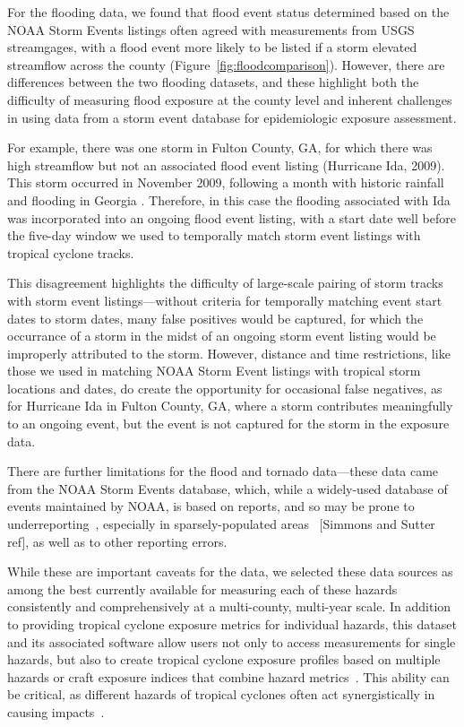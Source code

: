 For the flooding data, we found that flood event status determined based
on the NOAA Storm Events listings often agreed with measurements from \ac{USGS}
streamgages, with a flood event more likely to be listed if a storm elevated
streamflow across the county (Figure~\ref{fig:floodcomparison}).  However, there
are differences between the two flooding datasets, and these highlight both the
difficulty of measuring flood exposure at the county level and inherent
challenges in using data from a storm event database for epidemiologic exposure
assessment. 

For example, there was one storm in Fulton County, GA, for which there was high
streamflow but not an associated flood event listing (Hurricane Ida, 2009).
This storm occurred in November 2009, following a month with historic rainfall
and flooding in Georgia \parencite{shepherd2011overview}.  Therefore, in this
case the flooding associated with Ida was incorporated into an ongoing flood
event listing, with a start date well before the five-day window we used to
temporally match storm event listings with tropical cyclone tracks. 

This disagreement highlights the difficulty of large-scale pairing of storm
tracks with storm event listings---without criteria for temporally matching
event start dates to storm dates, many false positives would be
captured, for which the occurrance of a storm in the midst of an ongoing storm
event listing would be improperly attributed to the storm.  However, distance
and time restrictions, like those we used in matching NOAA Storm Event listings
with tropical storm locations and dates, do create the opportunity for
occasional false negatives, as for Hurricane Ida in Fulton County, GA, where a
storm contributes meaningfully to an ongoing event, but the event is not
captured for the storm in the exposure data.  

There are further limitations for the flood and tornado data---these data came
from the \ac{NOAA} Storm Events database, which, while a widely-used database
of events maintained by \ac{NOAA}, is based on reports, and so may be prone to
underreporting~\parencite{Ashley2008flood, Curran2000}, especially in
sparsely-populated areas~\parencite{Witt1998, Ashley2007} [Simmons and Sutter
ref], as well as to other reporting errors. 

While these are important caveats for the data, we selected these data sources
as among the best currently available for measuring each of these hazards
consistently and comprehensively at a multi-county, multi-year scale. In
addition to providing tropical cyclone exposure metrics for individual hazards,
this dataset and its associated software allow users not only to access
measurements for single hazards, but also to create tropical cyclone exposure
profiles based on multiple hazards or craft exposure indices that combine
hazard metrics~\parencite{chakraborty2005population, peduzzi2009assessing}.
This ability can be critical, as different hazards of tropical cyclones often
act synergistically in causing impacts~\parencite{smith2009}.  


